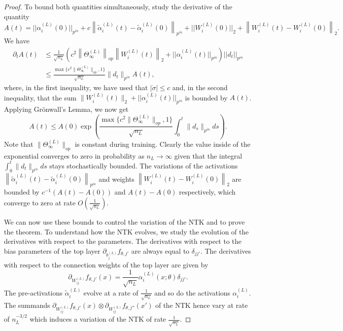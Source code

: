 \documentclass{article}
\begin{document}
\begin{proof}
To bound both quantities simultaneously, study the derivative of the quantity
$$
A(t) = ||\alpha^{(L)}_i(0)||_{p^{in}} + c \left\lVert \tilde{\alpha}^{(L)}_{i}(t) - \tilde{\alpha}^{(L)}_{i}(0) \right\rVert_{p^{in}} + || W^{(L)}_i(0) ||_2 + \left\lVert W^{(L)}_{i}(t) - W^{(L)}_{i}(0) \right\rVert_2.
$$
We have
\begin{align*}
 \partial_t A(t) &\leq \frac{1}{\sqrt{n_L}} \left( c^2 \left\lVert \Theta^{(L)}_\infty \right\rVert_{op} \left\lVert W^{(L)}_i(t)\right\rVert_2 + ||\alpha^{(L)}_i(t)||_{p^{in}} \right) ||d_t||_{p^{in}} \\ 
    &\leq \frac{\max\{c^2 \|\Theta^{(L)}_\infty \|_{op} , 1\} }{\sqrt{n_L}}\|d_t \|_{p^{in}}  A(t),
\end{align*} 
where, in the first inequality, we have used that $ | \dot{\sigma} | \leq c $ and, in the second inequality, that the sum $\lVert W^{(L)}_i(t) \rVert_2 + ||\alpha^{(L)}_i(t)||_{p^{in}}$ is bounded by $A(t)$.
Applying Gr\"onwall's Lemma, we now get
$$
 A(t) \leq A(0) \exp\left(\frac{\max\{c^2 \|\Theta^{(L)}_\infty \|_{op} , 1\} }{\sqrt{n_L}} \int_0^t \|d_s \|_{p^{in}} ds\right).
$$
Note that $ \|\Theta^{(L)}_\infty \|_{op}$ is constant during training. Clearly the value inside of the exponential converges to zero in probability as $n_L \to \infty$ given that the integral $\int_0^t \|d_t \|_{p^{in}} ds$ stays stochastically bounded. The variations of the activations $\left\lVert \tilde{\alpha}^{(L)}_{i}(t) - \tilde{\alpha}^{(L)}_{i}(0) \right\rVert_{p^{in}}$ and weights $\left\lVert W^{(L)}_{i}(t) - W^{(L)}_{i}(0) \right\rVert_2$ are bounded by $c^{-1}(A(t) - A(0))$ and $A(t) - A(0)$ respectively, which converge to zero at rate $O\left(\frac{1}{\sqrt{n_L}}\right)$. 

We can now use these bounds to control the variation of the NTK and to prove the theorem. To understand how the NTK evolves, we study the evolution of the derivatives with respect to the parameters. The derivatives with respect to the bias parameters of the top layer $\partial_{b^{(L)}_j}f_{\theta, j'}$ are always equal to $\delta_{jj'}$. The derivatives with respect to the connection weights of the top layer are given by
$$
\partial_{W^{(L)}_{ij}}f_{\theta, j'}(x) = \frac{1}{\sqrt{n_L}} \alpha^{(L)}_i(x ;\theta) \delta_{jj'}.
$$
The pre-activations $\tilde{\alpha}^{(L)}_i$ evolve at a rate of $\frac{1}{\sqrt{n_L}}$ and so do the activations $\alpha^{(L)}_i$. The summands $\partial_{W^{(L)}_{ij}}f_{\theta, j'}(x) \otimes \partial_{W^{(L)}_{ij}}f_{\theta, j''}(x')$ of the NTK hence vary at rate of $n_L^{-3/2}$ which induces a variation of the NTK of rate $\frac{1}{\sqrt{n_L}}$.


\end{proof}
\end{document}
